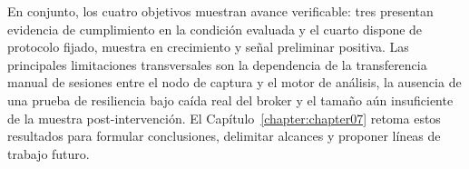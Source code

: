 En conjunto, los cuatro objetivos muestran avance verificable: tres presentan evidencia de cumplimiento en la condición evaluada y el cuarto dispone de protocolo fijado, muestra en crecimiento y señal preliminar positiva. Las principales limitaciones transversales son la dependencia de la transferencia manual de sesiones entre el nodo de captura y el motor de análisis, la ausencia de una prueba de resiliencia bajo caída real del broker y el tamaño aún insuficiente de la muestra post-intervención. El Capítulo~\ref{chapter:chapter07} retoma estos resultados para formular conclusiones, delimitar alcances y proponer líneas de trabajo futuro.

